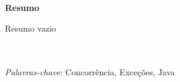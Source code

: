 
{
\Large
\begin{center}
\textbf{Resumo}
\end{center}
}

Resumo vazio

\quad\\
\quad\\
\textit{Palavras-chave}: Concorrência, Exceções, Java

\pagebreak
